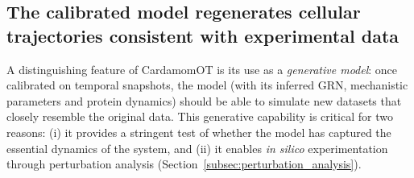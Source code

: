 \documentclass[a4paper, 11pt]{article}
\theoremstyle{plain}
\theoremstyle{remark}
\newcommand*{\firstreview}[1]{{\color{black}#1}}
\begin{document}
\subsection{The calibrated model \texorpdfstring{\firstreview{regenerates cellular trajectories consistent with experimental data}}{regenerates cellular trajectories consistent with experimental data}}
\label{subsec:generative_model_validation}

A distinguishing feature of CardamomOT is its use as a \emph{generative model}: once calibrated on temporal snapshots, the model (with its inferred GRN, mechanistic parameters and protein dynamics) should be able to simulate new datasets that closely resemble the original data. This generative capability is critical for two reasons: (i) it provides a stringent test of whether the model has captured the essential dynamics of the system, and (ii) it enables \emph{in silico} experimentation through perturbation analysis (Section~\ref{subsec:perturbation_analysis}).
\end{document}
